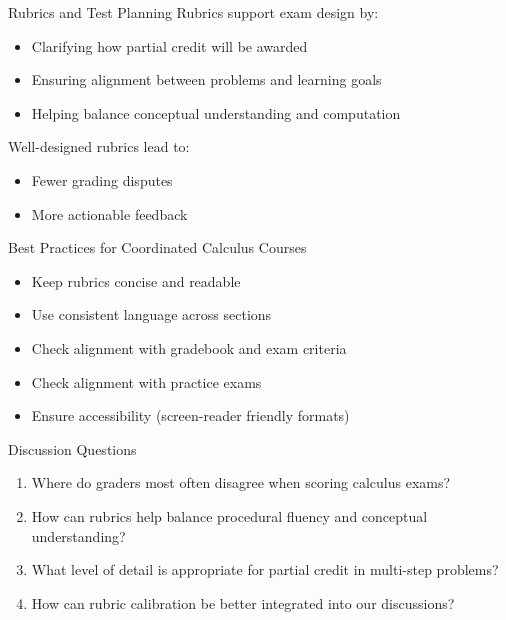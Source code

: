 \documentclass{beamer}
\begin{document}
\begin{frame}{Rubrics and Test Planning}
Rubrics support exam design by:
\begin{itemize}
    \item Clarifying how partial credit will be awarded
    \item Ensuring alignment between problems and learning goals
    \item Helping balance conceptual understanding and computation
\end{itemize}

\vspace{0.3cm}
Well-designed rubrics lead to:
\begin{itemize}
    \item Fewer grading disputes
    \item More actionable feedback
\end{itemize}
\end{frame}

\begin{frame}{Best Practices for Coordinated Calculus Courses}
\begin{itemize}
    \item Keep rubrics concise and readable
    \item Use consistent language across sections
    \item Check alignment with gradebook and exam criteria
    \item Check alignment with practice exams
    \item Ensure accessibility (screen-reader friendly formats)
\end{itemize}
\end{frame}

\begin{frame}{Discussion Questions}
\begin{enumerate}
    \item Where do graders most often disagree when scoring calculus exams?
    \item How can rubrics help balance procedural fluency and conceptual understanding?
    \item What level of detail is appropriate for partial credit in multi-step problems?
    \item How can rubric calibration be better integrated into our discussions?
\end{enumerate}
\end{frame}
\end{document}
